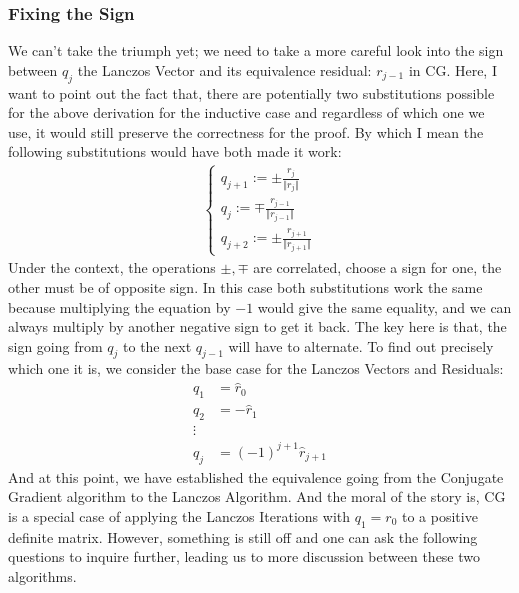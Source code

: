 \documentclass[]{article}
\theoremstyle{definition}
\begin{document}
        \subsubsection{Fixing the Sign}
            We can't take the triumph yet; we need to take a more careful look into the sign between $q_j$ the Lanczos Vector and its equivalence residual: $r_{j - 1}$ in CG. Here, I want to point out the fact that, there are potentially two substitutions possible for the above derivation for the inductive case and regardless of which one we use, it would still preserve the correctness for the proof. By which I mean the following substitutions would have both made it work: 
            \begin{align}
                \begin{cases}
                    q_{j + 1} := \pm \frac{r_j}{\Vert r_j\Vert}
                    \\
                    q_{j} := \mp \frac{r_{j - 1}}{\Vert r_{j - 1}\Vert}
                    \\
                    q_{j + 2} := \pm \frac{r_{j + 1}}{\Vert r_{j + 1}\Vert}
                \end{cases}
            \end{align}
            Under the context, the operations $\pm, \mp$ are correlated, choose a sign for one, the other must be of opposite sign. In this case both substitutions work the same because multiplying the equation by $-1$ would give the same equality, and we can always multiply by another negative sign to get it back. The key here is that, the sign going from $q_{j}$ to the next $q_{j - 1}$ will have to alternate. To find out precisely which one it is, we consider the base case for the Lanczos Vectors and Residuals: 
            \begin{align}
                q_1 &= \hat r_0\\
                q_2 &= -\hat r_1
                \\
                \vdots
                \\
                q_j &= (-1)^{j + 1}\hat r_{j + 1}
            \end{align}
            And at this point, we have established the equivalence going from the Conjugate Gradient algorithm to the Lanczos Algorithm. And the moral of the story is, CG is a special case of applying the Lanczos Iterations with $q_1 = r_0$ to a positive definite matrix. However, something is still off and one can ask the following questions to inquire further, leading us to more discussion between these two algorithms. 
\end{document}
